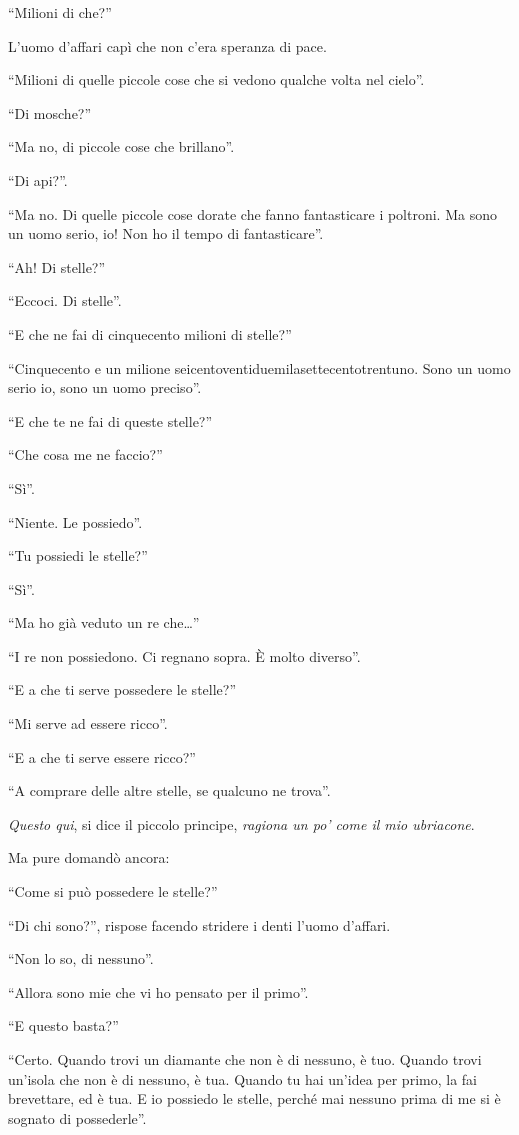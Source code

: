 \documentclass[11pt]{scrbook}
\begin{document}
``Milioni di che?''

L'uomo d'affari capì che non c'era speranza di pace.

``Milioni di quelle piccole cose che si vedono qualche volta nel cielo''.

``Di mosche?''

``Ma no, di piccole cose che brillano''.

``Di api?''.

``Ma no. Di quelle piccole cose dorate che fanno fantasticare i poltroni. Ma sono un uomo serio, io! Non ho il tempo di fantasticare''.

``Ah! Di stelle?''

``Eccoci. Di stelle''.

``E che ne fai di cinquecento milioni di stelle?''

``Cinquecento e un milione seicentoventiduemilasettecentotrentuno. Sono un uomo serio io, sono un uomo preciso''.

``E che te ne fai di queste stelle?''

``Che cosa me ne faccio?''

``Sì''.

``Niente. Le possiedo''.

``Tu possiedi le stelle?''

``Sì''.

``Ma ho già veduto un re che\ldots{}''

``I re non possiedono. Ci regnano sopra. È molto diverso''.

``E a che ti serve possedere le stelle?''

``Mi serve ad essere ricco''.

``E a che ti serve essere ricco?''

``A comprare delle altre stelle, se qualcuno ne trova''.

\emph{Questo qui}, si dice il piccolo principe, \emph{ragiona un po' come il mio ubriacone}.

Ma pure domandò ancora:

``Come si può possedere le stelle?''

``Di chi sono?'', rispose facendo stridere i denti l'uomo d'affari.

``Non lo so, di nessuno''.

``Allora sono mie che vi ho pensato per il primo''.

``E questo basta?''

``Certo. Quando trovi un diamante che non è di nessuno, è tuo. Quando trovi un'isola che non è di nessuno, è tua. Quando tu hai un'idea per primo, la fai brevettare, ed è tua. E io possiedo le stelle, perché mai nessuno prima di me si è sognato di possederle''.
\end{document}
